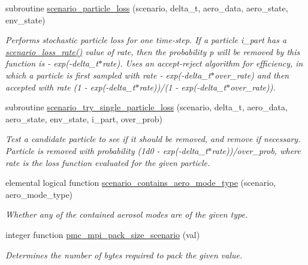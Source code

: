 \begin{DoxyCompactItemize}
subroutine \mbox{\hyperlink{namespacepmc__scenario_a275a4562c174d7090db3120235d4e97f}{scenario\+\_\+particle\+\_\+loss}} (scenario, delta\+\_\+t, aero\+\_\+data, aero\+\_\+state, env\+\_\+state)
\begin{DoxyCompactList}\small\item\em Performs stochastic particle loss for one time-\/step. If a particle {\ttfamily i\+\_\+part} has a \mbox{\hyperlink{namespacepmc__scenario_ab60e2eeb66ae8849ad11923d76a9bd7f}{scenario\+\_\+loss\+\_\+rate()}} value of rate, then the probability p will be removed by this function is { -\/ exp(-\/delta\+\_\+t$\ast$rate)}. Uses an accept-\/reject algorithm for efficiency, in which a particle is first sampled with rate { -\/ exp(-\/delta\+\_\+t$\ast$over\+\_\+rate) } and then accepted with rate {\ttfamily (1 -\/ exp(-\/delta\+\_\+t$\ast$rate))/(1 -\/ exp(-\/delta\+\_\+t$\ast$over\+\_\+rate))}. \end{DoxyCompactList}\item 
subroutine \mbox{\hyperlink{namespacepmc__scenario_ab3b05e77d36cc1b27c10ebd8d315df61}{scenario\+\_\+try\+\_\+single\+\_\+particle\+\_\+loss}} (scenario, delta\+\_\+t, aero\+\_\+data, aero\+\_\+state, env\+\_\+state, i\+\_\+part, over\+\_\+prob)
\begin{DoxyCompactList}\small\item\em Test a candidate particle to see if it should be removed, and remove if necessary. Particle is removed with probability (1d0 -\/ exp(-\/delta\+\_\+t$\ast$rate))/over\+\_\+prob, where rate is the loss function evaluated for the given particle. \end{DoxyCompactList}\item 
elemental logical function \mbox{\hyperlink{namespacepmc__scenario_afaea66be4e0e1ec9a4b80a2fda61f972}{scenario\+\_\+contains\+\_\+aero\+\_\+mode\+\_\+type}} (scenario, aero\+\_\+mode\+\_\+type)
\begin{DoxyCompactList}\small\item\em Whether any of the contained aerosol modes are of the given type. \end{DoxyCompactList}\item 
integer function \mbox{\hyperlink{namespacepmc__scenario_a135753482d6e0a63cf3947e6e017c618}{pmc\+\_\+mpi\+\_\+pack\+\_\+size\+\_\+scenario}} (val)
\begin{DoxyCompactList}\small\item\em Determines the number of bytes required to pack the given value. \end{DoxyCompactList}\item 

\end{DoxyCompactItemize}

